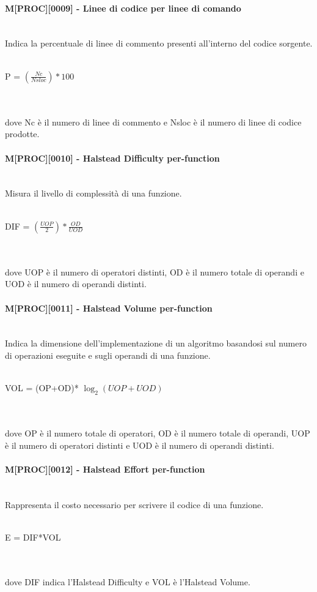 \paragraph{M[PROC][0009] - Linee di codice per linee di comando}
~\\Indica la percentuale di linee di commento presenti all'interno del codice sorgente.
\\\\
\centerline{P = ${\displaystyle({\frac {Nc}{Nsloc}})*100}$}
\\\\dove Nc è il numero di linee di commento e Nsloc è il numero di linee di codice prodotte.

\paragraph{M[PROC][0010] - Halstead Difficulty per-function}
~\\Misura il livello di complessità di una funzione.
\\\\
\centerline{DIF = ${\displaystyle({\frac {UOP}{2}})*{\frac {OD}{UOD}}}$}
\\\\dove UOP è il numero di operatori distinti, OD è il numero totale di operandi e UOD è il numero di operandi distinti.

\paragraph{M[PROC][0011] - Halstead Volume per-function}
~\\Indica la dimensione dell'implementazione di un algoritmo basandosi sul numero di operazioni eseguite e sugli operandi di una funzione.
\\\\
\centerline{VOL = (OP+OD)* ${\log_2 (UOP+UOD)}$}

\\\\dove OP è il numero totale di operatori, OD è il numero totale di operandi, UOP è il numero di operatori distinti e UOD è il numero di operandi distinti.

\paragraph{M[PROC][0012] - Halstead Effort per-function}
~\\Rappresenta il costo necessario per scrivere il codice di una funzione.
\\\\
\centerline{E = DIF*VOL}
\\\\dove DIF indica l'Halstead Difficulty e VOL è l'Halstead Volume.

